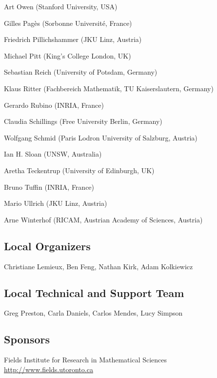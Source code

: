 \begin{multicols}{2}
Art Owen (Stanford University, USA)

Gilles Pagès (Sorbonne Universit\'{e}, France)

Friedrich Pillichshammer (JKU Linz, Austria)

Michael Pitt (King's College London, UK)

Sebastian Reich (University of Potsdam, Germany)

Klaus Ritter (Fachbereich Mathematik, TU Kaiserslautern, Germany)

Gerardo Rubino (INRIA, France)

Claudia Schillings (Free University Berlin, Germany)

Wolfgang Schmid (Paris Lodron University of Salzburg, Austria)

Ian H. Sloan (UNSW, Australia)

Aretha Teckentrup (University of Edinburgh, UK)

Bruno Tuffin (INRIA, France)

Mario Ullrich (JKU Linz, Austria)

Arne Winterhof (RICAM, Austrian Academy of Sciences, Austria)

\end{multicols}




\clearpage



\subsection{Local Organizers}
\update{}

Christiane Lemieux, Ben Feng, Nathan Kirk, Adam Kolkiewicz

\subsection{Local Technical and Support Team}
Greg Preston, Carla Daniels, Carlos Mendes, Lucy Simpson


\subsection{Sponsors}



Fields Institute for Research in Mathematical Sciences\\
\url{http://www.fields.utoronto.ca}

